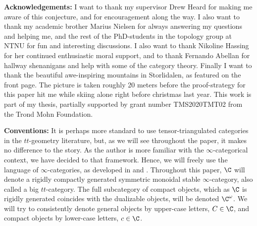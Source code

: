 \textbf{Acknowledgements:} I want to thank my supervisor Drew Heard for making me aware of this conjecture, and for encouragement along the way. I also want to thank my academic brother Marius Nielsen for always answering my questions and helping me, and the rest of the PhD-students in the topology group at NTNU for fun and interesting discussions. I also want to thank Nikoline Hassing for her continued enthusiastic moral support, and to thank Fernando Abellan for hallway shenanigans and help with some of the category theory. Finally I want to thank the beautiful awe-inspiring mountains in Storlidalen, as featured on the front page. The picture is taken roughly 20 meters before the proof-strategy for this paper hit me while skiing alone right before christmas last year. This work is part of my thesis, partially supported by grant number TMS2020TMT02 from the Trond Mohn Foundation. 

\textbf{Conventions:} It is perhaps more standard to use tensor-triangulated categories in the $tt$-geometry literature, but, as we will see throughout the paper, it makes no difference to the story. As the author is more familiar with the $\infty$-categorical context, we have decided to that framework. Hence, we will freely use the language of $\infty$-categories, as developed in \cite{lurie_09} and \cite{Lurie_HA}. Throughout this paper, $\C$ will denote a rigidly compactly generated symmetric monoidal stable $\infty$-category, also called a big $tt$-category. The full subcategory of compact objects, which as $\C$ is rigidly generated coincides with the dualizable objects, will be denoted $\C^\omega$. We will try to consistently denote general objects by upper-case letters, $C\in \C$, and compact objects by lower-case letters, $c\in \C$. 

